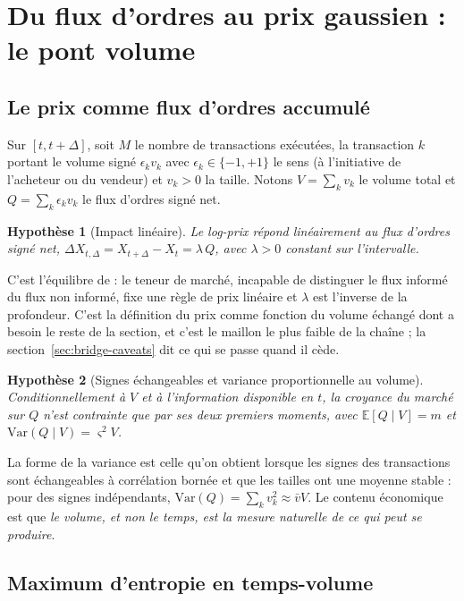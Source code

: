 \documentclass[11pt]{article}
\newtheorem{assumption}{Hypothèse}
\theoremstyle{definition}
\theoremstyle{remark}
\begin{document}
\section{Du flux d'ordres au prix gaussien : le pont volume}
\label{sec:bridge}

\subsection{Le prix comme flux d'ordres accumulé}

Sur $[t,t+\Delta]$, soit $M$ le nombre de transactions exécutées, la transaction
$k$ portant le volume signé $\epsilon_k v_k$ avec $\epsilon_k\in\{-1,+1\}$ le
sens (à l'initiative de l'acheteur ou du vendeur) et $v_k>0$ la taille. Notons
$V=\sum_k v_k$ le volume total et $Q=\sum_k \epsilon_k v_k$ le flux d'ordres
signé net.

\begin{assumption}[Impact linéaire]\label{as:impact}
Le log-prix répond linéairement au flux d'ordres signé net,
$\Delta X_{t,\Delta} = X_{t+\Delta}-X_t = \lambda\,Q$, avec $\lambda>0$ constant
sur l'intervalle.
\end{assumption}

C'est l'équilibre de \citet{kyle1985} : le teneur de marché, incapable de
distinguer le flux informé du flux non informé, fixe une règle de prix linéaire
et $\lambda$ est l'inverse de la profondeur. C'est la définition du \og prix
comme fonction du volume échangé \fg{} dont a besoin le reste de la section, et
c'est le maillon le plus faible de la chaîne ; la
section~\ref{sec:bridge-caveats} dit ce qui se passe quand il cède.

\begin{assumption}[Signes échangeables et variance proportionnelle au volume]
\label{as:signs}
Conditionnellement à $V$ et à l'information disponible en $t$, la croyance du
marché sur $Q$ n'est contrainte que par ses deux premiers moments, avec
$\mathbb{E}[Q\mid V] = m$ et $\mathrm{Var}(Q\mid V) = \varsigma^2 V$.
\end{assumption}

La forme de la variance est celle qu'on obtient lorsque les signes des
transactions sont échangeables à corrélation bornée et que les tailles ont une
moyenne stable : pour des signes indépendants,
$\mathrm{Var}(Q)=\sum_k v_k^2 \approx \bar v V$. Le contenu économique est que
\emph{le volume, et non le temps, est la mesure naturelle de ce qui peut se
produire}.

\subsection{Maximum d'entropie en temps-volume}
\end{document}
